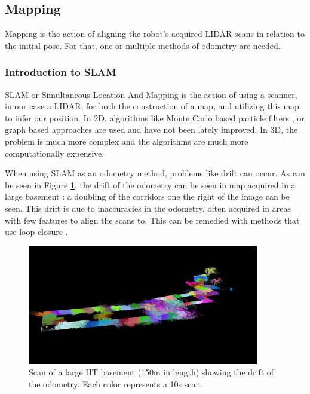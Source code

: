 \documentclass[12pt]{article}
\begin{document}
    \subsection{Mapping}

        Mapping is the action of aligning the robot's acquired LIDAR scans in relation to the initial pose. For that, one or multiple methods of odometry are needed. 
        \subsubsection{Introduction to SLAM}
        SLAM or Simultaneous Location And Mapping is the action of using a scanner, in our case a LIDAR, for both the construction of a map, and utilizing this map to infer our position. In 2D, algorithms like Monte Carlo based particle filters \cite{fox1999monte}, or graph based approaches \cite{macenski2021slam} are used and have not been lately improved. In 3D, the problem is much more complex and the algorithms are much more computationally expensive. 
        
        When using SLAM as an odometry method, problems like drift can occur. As can be seen in Figure \ref{fig:scan_basement}, the drift of the odometry can be seen in map acquired in a large basement : a doubling of the corridors one the right of the image can be seen. This drift is due to inaccuracies in the odometry, often acquired in areas with few features to align the scans to. This can be remedied with methods that use loop closure \cite{chen2021inertial} \cite{liu2022enhanced}.

        \begin{figure}[H]
            \centering
            \includegraphics[width=0.9\textwidth]{Images/scan_basement.png}
            \caption{Scan of a large IIT basement (150m in length) showing the drift of the odometry. Each color represents a 10s scan.} 
            \label{fig:scan_basement}
        \end{figure}
\end{document}
